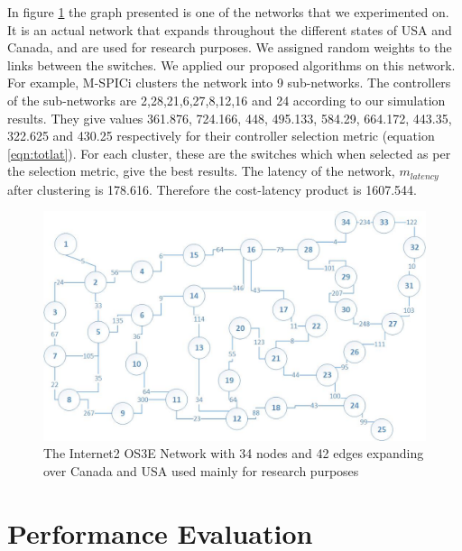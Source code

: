 \documentclass[a4paper,twocolumn,preprint]{elsarticle}
\begin{document}
In figure \ref{fig:example} the graph presented is one of the networks that we experimented on. It is an actual network that expands throughout the different states of USA and Canada, and are used for research purposes. We assigned random weights to the links between the switches. We applied our proposed algorithms on this network. For example, M-SPICi clusters the network into 9 sub-networks. The controllers of the sub-networks are 2,28,21,6,27,8,12,16 and 24 according to our simulation results. They give values 361.876, 724.166, 448, 495.133, 584.29, 664.172, 443.35, 322.625 and 430.25 respectively for their controller selection metric (equation \ref{eqn:totlat}). For each cluster, these are the switches which when selected as per the selection metric, give the best results. The latency of the network, $m_{latency}$ after clustering is 178.616. Therefore the cost-latency product is 1607.544.
\begin{figure}
	\includegraphics[width=\linewidth]{example.jpg}
	\caption{The Internet2 OS3E Network with 34 nodes and 42 edges expanding over Canada and USA used mainly for research purposes}
	\label{fig:example}
\end{figure}

\section{Performance Evaluation} \label {performance}
\end{document}
